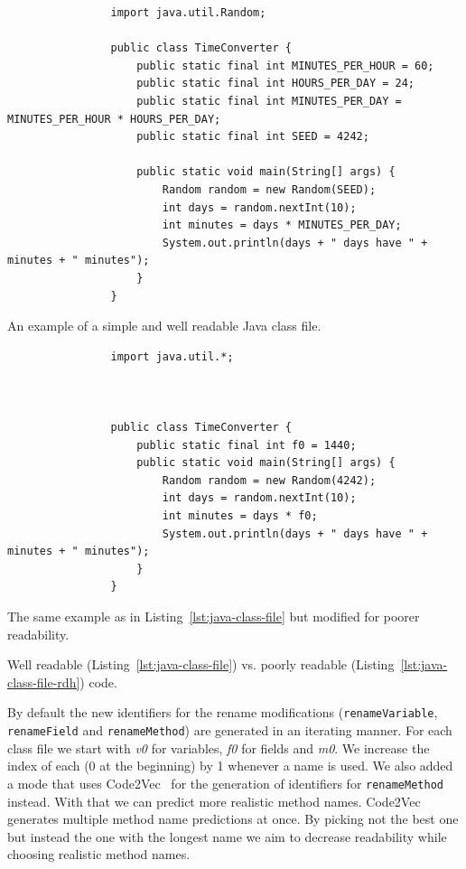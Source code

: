 \documentclass[%
class=scrreprt,
chapterprefix=false,%
open=right,%
twoside=false,%
paper=a4,%
logofile={Logo\_zentral\_farbig\_EN.png},%
thesistype=master,%
UKenglish,%
]{se2thesis}
\theoremstyle{definition}
\begin{document}
	\begin{listing}[p]
		\begin{sublisting}{\linewidth}
			\begin{verbatim}
				import java.util.Random;
				
				public class TimeConverter {
					public static final int MINUTES_PER_HOUR = 60;
					public static final int HOURS_PER_DAY = 24;
					public static final int MINUTES_PER_DAY = MINUTES_PER_HOUR * HOURS_PER_DAY;
					public static final int SEED = 4242;
					
					public static void main(String[] args) {
						Random random = new Random(SEED);
						int days = random.nextInt(10);
						int minutes = days * MINUTES_PER_DAY;
						System.out.println(days + " days have " + minutes + " minutes");
					}
				}
			\end{verbatim}
			\caption{An example of a simple and well readable Java class file.}
			\label{lst:java-class-file}
		\end{sublisting}
		\vspace{1pt}
		
		\begin{sublisting}{\linewidth}
			\begin{verbatim}
				import java.util.*;
				
				
				
				public class TimeConverter {
					public static final int f0 = 1440;
					public static void main(String[] args) {
						Random random = new Random(4242);
						int days = random.nextInt(10);
						int minutes = days * f0;
						System.out.println(days + " days have " + minutes + " minutes");
					}
				}
			\end{verbatim}
			\caption{The same example as in Listing~\ref{lst:java-class-file} but modified for poorer readability.}
			\label{lst:java-class-file-rdh}
		\end{sublisting}
		\caption{Well readable (Listing~\ref{lst:java-class-file}) vs. poorly readable (Listing~\ref{lst:java-class-file-rdh}) code.}
	\end{listing}
	
	By default the new identifiers for the rename modifications (\texttt{renameVariable}, \texttt{renameField} and \texttt{renameMethod}) are generated in an iterating manner. For each class file we start with \textit{v0} for variables, \textit{f0} for fields and \textit{m0}. We increase the index of each (0 at the beginning) by 1 whenever a name is used.
	We also added a mode that uses Code2Vec~\cite{alon2019code2vec} for the generation of identifiers for \texttt{renameMethod} instead. With that we can predict more realistic method names. Code2Vec generates multiple method name predictions at once. By picking not the best one but instead the one with the longest name we aim to decrease readability while choosing realistic method names.
		
\end{document}
